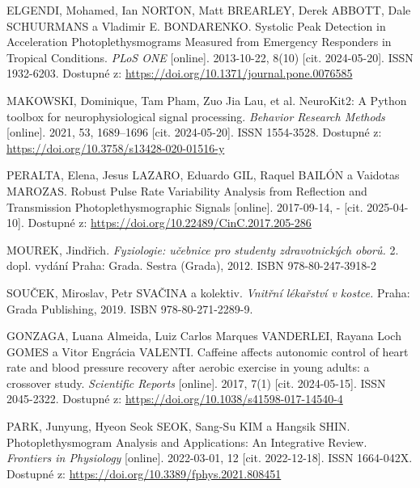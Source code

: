 \begin{thebibliography}{99}
		ELGENDI, Mohamed, Ian NORTON, Matt BREARLEY, Derek ABBOTT, Dale SCHUURMANS a Vladimir E. BONDARENKO.
		Systolic Peak Detection in Acceleration Photoplethysmograms Measured from Emergency Responders in Tropical Conditions.
		\emph{PLoS ONE} [online].
		2013-10-22, 8(10) [cit. 2024-05-20].
		ISSN 1932-6203.
		Dostupné z: \url{https://doi.org/10.1371/journal.pone.0076585}

		MAKOWSKI, Dominique, Tam Pham, Zuo Jia Lau, et al.
		NeuroKit2: A Python toolbox for neurophysiological signal processing.
		\emph{Behavior Research Methods} [online].
		2021, 53, 1689–1696 [cit. 2024-05-20].
		ISSN 1554-3528.
		Dostupné z: \url{https://doi.org/10.3758/s13428-020-01516-y}

		PERALTA, Elena, Jesus LAZARO, Eduardo GIL, Raquel BAILÓN a Vaidotas MAROZAS.
		Robust Pulse Rate Variability Analysis from Reflection and Transmission Photoplethysmographic Signals [online].
		2017-09-14, - [cit. 2025-04-10].
		Dostupné z: \url{https://doi.org/10.22489/CinC.2017.205-286}

		MOUREK, Jindřich.
		\emph{Fyziologie: učebnice pro studenty zdravotnických oborů.}
		2.\, dopl. vydání Praha: Grada. Sestra (Grada), 2012.
		ISBN 978-80-247-3918-2

		SOUČEK, Miroslav, Petr SVAČINA a kolektiv.
		\emph{Vnitřní lékařství v kostce.}
		Praha: Grada Publishing, 2019.
		ISBN 978-80-271-2289-9.

		GONZAGA, Luana Almeida, Luiz Carlos Marques VANDERLEI, Rayana Loch GOMES a Vitor Engrácia VALENTI.
		Caffeine affects autonomic control of heart rate and blood pressure recovery after aerobic exercise in young adults: a crossover study.
		\emph{Scientific Reports} [online].
		2017, 7(1) [cit. 2024-05-15].
		ISSN 2045-2322.
		Dostupné z: \url{https://doi.org/10.1038/s41598-017-14540-4}

		PARK, Junyung, Hyeon Seok SEOK, Sang-Su KIM a Hangsik SHIN.
		Photoplethysmogram Analysis and Applications: An Integrative Review.
		\emph{Frontiers in Physiology} [online].
		2022-03-01, 12 [cit. 2022-12-18].
		ISSN 1664-042X.
		Dostupné z: \url{https://doi.org/10.3389/fphys.2021.808451}


\end{thebibliography}
